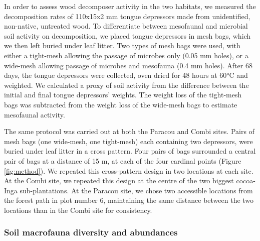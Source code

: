 \documentclass[fleqn,10pt]{ArtEcoFoG} %
\begin{document}
In order to assess wood decomposer activity in the two habitats, we measured the decomposition rates of 110x15x2 mm tongue depressors made from unidentified, non-native, untreated wood. To differentiate between mesofaunal and microbial soil activity on decomposition, we placed tongue depressors in mesh bags, which we then left buried under leaf litter. Two types of mesh bags were used, with either a tight-mesh allowing the passage of microbes only (0.05 mm holes), or a wide-mesh allowing passage of microbes and mesofauna (0.4 mm holes). After 68 days, the tongue depressors were collected, oven dried for 48 hours at 60°C and weighted. We calculated a proxy of soil activity from the difference between the initial and final tongue depressors' weights. The weight loss of the tight-mesh bags was subtracted from the weight loss of the wide-mesh bags to estimate mesofaunal activity.

The same protocol was carried out at both the Paracou and Combi sites. Pairs of mesh bags (one wide-mesh, one tight-mesh) each containing two depressors, were buried under leaf litter in a cross pattern. Four pairs of bags surrounded a central pair of bags at a distance of 15 m, at each of the four cardinal points (Figure \ref{fig:method}). We repeated this cross-pattern design in two locations at each site. At the Combi site, we repeated this design at the centre of the two biggest cocoa-Inga sub-plantations. At the Paracou site, we chose two accessible locations from the forest path in plot number 6, maintaining the same distance between the two locations than in the Combi site for consistency.

\subsubsection{Soil macrofauna diversity and abundances}\label{soil-macrofauna-diversity-and-abundances}
\end{document}
